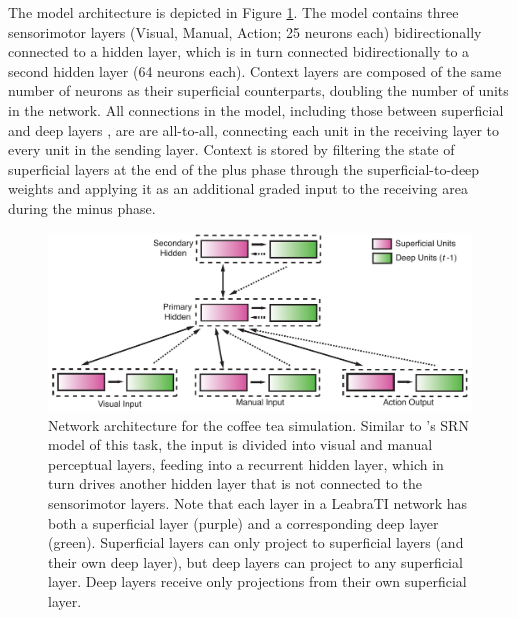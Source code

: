 \documentclass[10pt,letterpaper]{article}
\numberwithin{equation}{section}
\begin{document}
The model architecture is depicted in Figure \ref{fig:coffeenet}. The model contains three sensorimotor layers (Visual, Manual, Action; 25 neurons each) bidirectionally connected to a hidden layer, which is in turn connected bidirectionally to a second hidden layer (64 neurons each). Context layers are composed of the same number of neurons as their superficial counterparts, doubling the number of units in the network. All connections in the model, including those between superficial and deep layers , are are all-to-all, connecting each unit in the receiving layer to every unit in the sending layer. Context is stored by filtering the state of superficial layers at the end of the plus phase through the superficial-to-deep weights and applying it as an additional graded input to the receiving area during the minus phase.

\begin{figure}[h]
  \centering
  \includegraphics[width=\textwidth]{figs/coffee_tea_arch}
  \caption{\small{Network architecture for the coffee tea simulation. Similar to \protect{}'s SRN model of this task, the input is divided into visual and manual perceptual layers, feeding into a recurrent hidden layer, which in turn drives another hidden layer that is not connected to the sensorimotor layers. Note that each layer in a LeabraTI network has both a superficial layer (purple) and a corresponding deep layer (green). Superficial layers can only project to superficial layers (and their own deep layer), but deep layers can project to any superficial layer. Deep layers receive only projections from their own superficial layer.}}
  \label{fig:coffeenet}
\end{figure}
\end{document}
